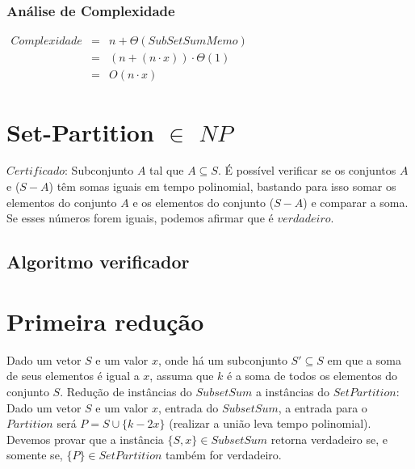 \documentclass[12pt]{article}
\begin{document}
\subsubsection{Análise de Complexidade}

$\begin{matrix}
Complexidade&=& n + \Theta(SubSetSumMemo)\\
		  \ &=& (n + (n \cdot x)) \cdot \Theta(1)\\
          \ &=& O(n \cdot x)
\end{matrix}$

\section{Set-Partition $\in$ $NP$} \label{sec:PartitionInNP}

$Certificado$: Subconjunto $A$ tal que $A \subseteq S$. É possível verificar se os conjuntos $A$ e ($S-A$) têm somas iguais em tempo polinomial, bastando para isso somar os elementos do conjunto $A$ e os elementos do conjunto ($S-A$) e comparar a soma. Se esses números forem iguais, podemos afirmar que é $verdadeiro$.

\subsection{Algoritmo verificador}
\begin{algorithm}[H]
\end{algorithm}
\section{Primeira redução}

Dado um vetor $S$ e um valor $x$, onde há um subconjunto  $S' \subseteq S$ em que a soma de seus elementos é igual a $x$, assuma que $k$ é a soma de todos os elementos do conjunto $S$.
Redução de instâncias do $SubsetSum$ a instâncias do $SetPartition$: Dado um vetor $S$ e um valor $x$, entrada do $SubsetSum$, a entrada para o $Partition$ será $P = S \cup \{k-2x\}$ (realizar a união leva tempo polinomial). Devemos provar que a instância $\{S,x\} \in SubsetSum$ retorna verdadeiro se, e somente se, $\{P\} \in SetPartition$ também for verdadeiro.
\end{document}
